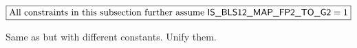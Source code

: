 \[
	\boxed{\text{All constraints in this subsection further assume } \textsf{IS\_BLS12\_MAP\_FP2\_TO\_G2} = 1}
\]

Same as \oobInstBlsGOneAdd{} but with different constants. Unify them.